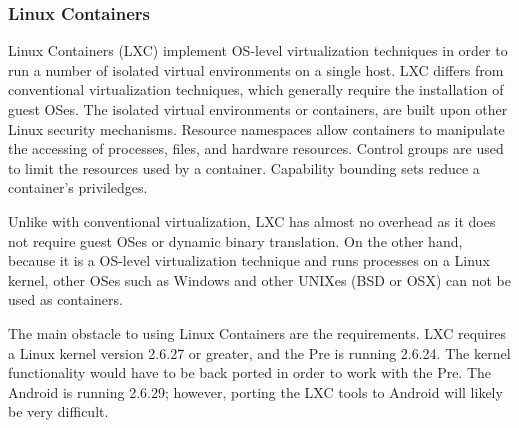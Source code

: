 \subsubsection{Linux Containers}
Linux Containers (LXC) implement OS-level virtualization techniques in order to run a number of isolated virtual environments on a single host.  LXC differs from conventional virtualization techniques, which generally require the installation of guest OSes.  The isolated virtual environments or containers, are built upon other Linux security mechanisms.  Resource namespaces allow containers to manipulate the accessing of processes, files, and hardware resources.  Control groups are used to limit the resources used by a container.  Capability bounding sets reduce a container's priviledges.  

Unlike with conventional virtualization, LXC has almost no overhead as it does not require guest OSes or dynamic binary translation.  On the other hand, because it is a OS-level virtualization technique and runs processes on a Linux kernel, other OSes such as Windows and other UNIXes (BSD or OSX) can not be used as containers.  

The main obstacle to using Linux Containers are the requirements.  LXC requires a Linux kernel version 2.6.27 or greater, and the Pre is running 2.6.24.  The kernel functionality would have to be back ported in order to work with the Pre.  The Android is running 2.6.29; however, porting the LXC tools to Android will likely be very difficult.
